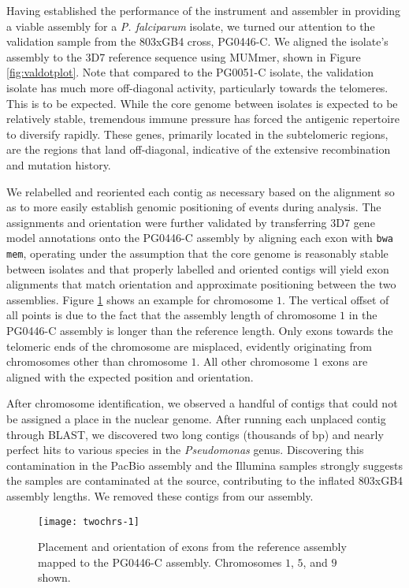 Having established the performance of the instrument and assembler in providing a viable assembly for a \textit{P. falciparum} isolate, we turned our attention to the validation sample from the 803xGB4 cross, PG0446-C.  We aligned the isolate's assembly to the 3D7 reference sequence using MUMmer, shown in Figure \ref{fig:valdotplot}.  Note that compared to the PG0051-C isolate, the validation isolate has much more off-diagonal activity, particularly towards the telomeres.  This is to be expected.  While the core genome between isolates is expected to be relatively stable, tremendous immune pressure has forced the antigenic repertoire to diversify rapidly.  These genes, primarily located in the subtelomeric regions, are the regions that land off-diagonal, indicative of the extensive recombination and mutation history.

We relabelled and reoriented each contig as necessary based on the alignment so as to more easily establish genomic positioning of events during analysis.  The assignments and orientation were further validated by transferring 3D7 gene model annotations onto the PG0446-C assembly by aligning each exon with \texttt{bwa mem}, operating under the assumption that the core genome is reasonably stable between isolates and that properly labelled and oriented contigs will yield exon alignments that match orientation and approximate positioning between the two assemblies.  Figure \ref{fig:loadGff} shows an example for chromosome $1$.  The vertical offset of all points is due to the fact that the assembly length of chromosome $1$ in the PG0446-C assembly is longer than the reference length.  Only exons towards the telomeric ends of the chromosome are misplaced, evidently originating from chromosomes other than chromosome $1$.  All other chromosome $1$ exons are aligned with the expected position and orientation.

After chromosome identification, we observed a handful of contigs that could not be assigned a place in the nuclear genome.  After running each unplaced contig through BLAST, we discovered two long contigs (thousands of bp) and nearly perfect hits to various species in the \textit{Pseudomonas} genus.  Discovering this contamination in the PacBio assembly and the Illumina samples strongly suggests the samples are contaminated at the source, contributing to the inflated 803xGB4 assembly lengths.  We removed these contigs from our assembly.

\begin{figure}[h!]
  \centering
    \texttt{[image: twochrs-1]}
  \caption{Placement and orientation of exons from the reference assembly mapped to the PG0446-C assembly.  Chromosomes $1$, $5$, and $9$ shown.}
  \label{fig:loadGff}
\end{figure}

